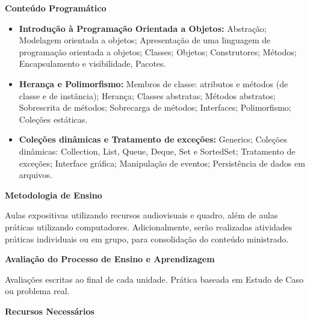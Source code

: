 
\begin{snugshade}\begin{center}\textbf{
    Conteúdo Programático
}\end{center}\end{snugshade}

\begin{itemize}

 \item \textbf{Introdução à Programação Orientada a Objetos:} Abstração; Modelagem orientada a objetos; Apresentação de uma linguagem de programação orientada a objetos;	Classes; Objetos; Construtores; Métodos; Encapsulamento e visibilidade, Pacotes.


 \item \textbf{Herança e Polimorfismo:} Membros de classe: atributos e métodos (de classe e de instância); Herança;	Classes abstratas; Métodos abstratos; Sobrescrita de métodos; Sobrecarga de métodos; Interfaces;	Polimorfismo; Coleções estáticas.

 \item \textbf{Coleções dinâmicas e Tratamento de exceções:} Generics; Coleções dinâmicas: Collection, List, Queue, Deque, Set e SortedSet; Tratamento de exceções; Interface gráfica; Manipulação de eventos; Persistência de dados em arquivos.

\end{itemize}

\begin{snugshade}\begin{center}\textbf{
    Metodologia de Ensino
}\end{center}\end{snugshade}

\noindent
      Aulas expositivas utilizando recursos audiovisuais e quadro, além de aulas práticas utilizando computadores. Adicionalmente, serão realizadas atividades práticas individuais ou em grupo, para consolidação do conteúdo ministrado.

\begin{snugshade}\begin{center}\textbf{
    Avaliação do Processo de Ensino e Aprendizagem
}\end{center}\end{snugshade}

\noindent
  Avaliações escritas ao final de cada unidade. Prática baseada em Estudo de Caso ou problema real.
  
\begin{snugshade}\begin{center}\textbf{
    Recursos Necessários
    \vphantom{q} %
}\end{center}\end{snugshade}

